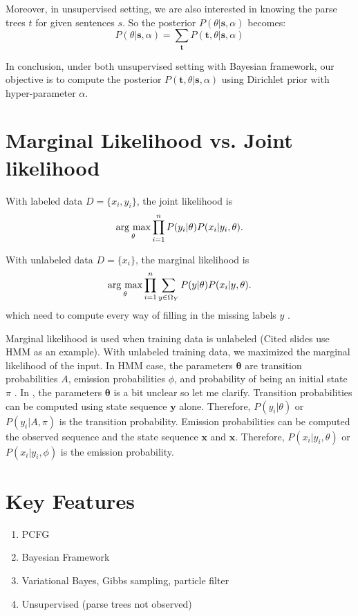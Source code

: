 \documentclass[11pt]{article}
\newcommand{\argmax}{\mathop{\rm arg~max}\limits}
\begin{document}
Moreover, in unsupervised setting, we are also interested in knowing the parse trees $t$ for given sentences $s$. So the posterior $P(\theta|\boldsymbol{s}, \alpha)$ becomes:
$$
P(\theta|\boldsymbol{s}, \alpha) = \sum_{\boldsymbol{t}} P(\boldsymbol{t}, \theta | \boldsymbol{s}, \alpha) 
$$

In conclusion, under both unsupervised setting with Bayesian framework, our objective is to compute the posterior $P(\boldsymbol{t}, \theta | \boldsymbol{s}, \alpha)$ using Dirichlet prior with hyper-parameter $\alpha$.

\section{Marginal Likelihood vs. Joint likelihood}

With labeled data $D = \{x_i, y_i\}$, the joint likelihood \cite{joint_vs_marginal} is
$$
\argmax_{\theta} \prod^n_{i = 1} P(y_i|\theta) P(x_i|y_i, \theta).
$$

With unlabeled data $D = \{x_i\}$, the marginal likelihood \cite{joint_vs_marginal} is
$$
\argmax_{\theta} \prod^n_{i = 1} \sum_{y \in \Omega_Y}P(y|\theta) P(x_i|y, \theta).
$$
which need to compute every way of filling in the missing labels $y$ \cite{mlss09}.


Marginal likelihood is used when training data is unlabeled \cite{joint_vs_marginal} (Cited slides use HMM as an example). 
With unlabeled training data, we maximized the marginal likelihood of the input. In HMM case, the parameters $\boldsymbol{\theta}$ are transition probabilities $A$, emission probabilities $\phi$, and probability of being an initial state $\pi$ \cite{hmm_parameters}. In \cite{joint_vs_marginal}, the parameters $\boldsymbol{\theta}$ is a bit unclear so let me clarify. Transition probabilities can be computed using state sequence $\boldsymbol{y}$ alone. Therefore, $P(y_i|\theta)$ or $P(y_i|A, \pi)$ is the transition probability. Emission probabilities can be computed the observed sequence and the state sequence $\boldsymbol{x}$ and $\boldsymbol{x}$. Therefore, $P(x_i|y_i,\theta)$ or $P(x_i|y_i, \phi)$ is the emission probability. 

\section{Key Features}
\begin{enumerate}
 \item PCFG
 \item Bayesian Framework
 \item Variational Bayes, Gibbs sampling, particle filter
 \item Unsupervised (parse trees not observed)
\end{enumerate}
\end{document}
